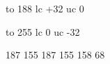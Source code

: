 

\startmapping[ec]




 to 188 lc +32 uc 0


 to 255 lc 0 uc -32


 187 155 %
 187 155 %
 158  68 %





